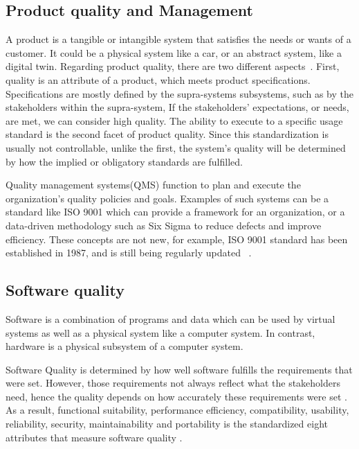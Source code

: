 \documentclass{llncs}
\begin{document}
    \subsection{Product quality and Management}
    A product is a tangible or intangible system that satisfies the needs or wants of a customer. It could be a physical system like a car, or an abstract system, like a digital twin. 
    Regarding product quality, there are two different aspects~\cite{GrievesPLMBook}.
    First, quality is an attribute of a product, which meets product specifications. Specifications are mostly defined by the supra-systems subsystems, 
    such as by the stakeholders within the supra-system,  If the stakeholders' expectations, or needs, are met, we can consider high quality.
    The ability to execute to a specific usage standard is the second facet of product quality. Since this standardization is usually not controllable, 
    unlike the first, the system's quality will be determined by how the implied or obligatory standards are fulfilled.


    Quality management systems(QMS) function to plan and execute the organization's quality policies and goals. 
    Examples of such systems can be a standard like ISO 9001 which can provide a framework for an organization, or a data-driven methodology such as Six Sigma to reduce defects and improve efficiency. 
    These concepts are not new, for example, ISO 9001 standard has been established in 1987, and is still being regularly updated ~\cite{ISO90012015}. 
    \subsection{Software quality}
    Software is a combination of programs and data which can be used by virtual 
    systems as well as a physical system like a computer system. In contrast, hardware 
    is a physical subsystem of a computer system\cite{OxfordDictionary}. 

    Software Quality is determined by how well software fulfills the requirements that were set. However, those requirements  
    not always reflect what the stakeholders need, hence the quality depends on how accurately these requirements were set \cite{IEE730-2014}. 
    As a result, functional suitability, performance efficiency, compatibility, usability, reliability, security, maintainability 
    and portability is the standardized eight attributes that measure software quality \cite{ISO/IEC:25010}.
    
\end{document}
